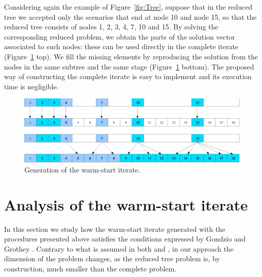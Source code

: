 Considering again the example of Figure~\ref{fig:Tree}, suppose that 
in the reduced tree we accepted only the scenarios that end at 
node 10 and node 15, so that the reduced tree consists of nodes 
1, 2, 3, 4, 7, 10 and 15. By solving the corresponding reduced problem, 
we obtain the parts of the solution vector associated to such 
nodes: these can be used directly in the complete iterate
(Figure~\ref{fig:Solution} top). 
We fill the missing elements 
by reproducing the solution from the nodes in the same subtree 
and the same stage (Figure~\ref{fig:Solution} bottom).
The proposed way of constructing the complete iterate is easy to
implement and its execution time is negligible.
%
\begin{figure}[ht]
  \begin{center}
    \includegraphics[scale=.51]{figures/solution.eps}
    \caption{Generation of the warm-start iterate.}
    \label{fig:Solution}
  \end{center}
  \vspace{-3ex}
\end{figure}


%
%
\section{Analysis of the warm-start iterate}
\label{sec:Analysis}

In this section we study how the warm-start iterate generated with 
the procedures presented above satisfies the conditions expressed by 
Gondzio and Grothey \cite{GondzioGrothey03}. 
Contrary to what is assumed in both \cite{YildirimWright} and 
\cite{GondzioGrothey03}, in our approach the dimension of the problem changes, 
as the reduced tree problem is, by construction, much smaller than the 
complete problem.

